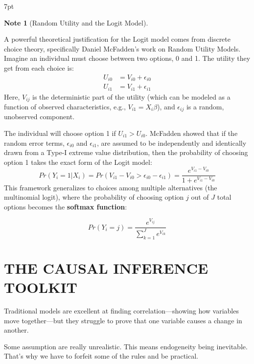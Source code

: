 \documentclass{article}
\newenvironment{blueblock}{
\def\FrameCommand{
  \hspace{1pt}
    {\color{DarkBlue}
    \vrule width 2pt}
    {\color{blueshade}
    \vrule width 4pt}
  \colorbox{blueshade}
}
\MakeFramed{
  \advance
  \hsize-
  \width
  \FrameRestore}
\noindent\hspace{-4.55pt}%
\begin{adjustwidth}{}{7pt}
\vspace{2pt}\vspace{2pt}
}
{\vspace{2pt}\end{adjustwidth}\endMakeFramed}
\newtheorem{note}{Note}
\begin{document}
\begin{blueblock}
\begin{note}[Random Utility and the Logit Model]\label{note:mcfadden}
\end{note}
A powerful theoretical justification for the Logit model comes from discrete choice theory, specifically Daniel McFadden's work on Random Utility Models. Imagine an individual must choose between two options, 0 and 1. The utility they get from each choice is:
\begin{align*}
    U_{i0} &= V_{i0} + \epsilon_{i0} \\
    U_{i1} &= V_{i1} + \epsilon_{i1}
\end{align*}
Here, $V_{ij}$ is the deterministic part of the utility (which can be modeled as a function of observed characteristics, e.g., $V_{i1} = X_i\beta$), and $\epsilon_{ij}$ is a random, unobserved component.

The individual will choose option 1 if $U_{i1} > U_{i0}$. McFadden showed that if the random error terms, $\epsilon_{i0}$ and $\epsilon_{i1}$, are assumed to be independently and identically drawn from a Type-I extreme value distribution, then the probability of choosing option 1 takes the exact form of the Logit model:
\begin{equation}
    Pr(Y_i=1|X_i) = Pr(V_{i1} - V_{i0} > \epsilon_{i0} - \epsilon_{i1}) = \frac{e^{V_{i1}-V_{i0}}}{1+e^{V_{i1}-V_{i0}}}
\end{equation}
This framework generalizes to choices among multiple alternatives (the multinomial logit), where the probability of choosing option $j$ out of $J$ total options becomes the \textbf{softmax function}: 

\begin{equation}
  Pr(Y_i=j) = \frac{e^{V_{ij}}}{\sum_{k=1}^J e^{V_{ik}}}
\end{equation}
\end{blueblock}







\newpage
\part{THE CAUSAL INFERENCE TOOLKIT}


Traditional models are excellent at finding correlation—showing how variables move together—but they struggle to prove that one variable causes a change in another.

Some assumption are really unrealistic. This means endogeneity being inevitable. That's why we have to forfeit some of the rules and be practical. 
\end{document}
